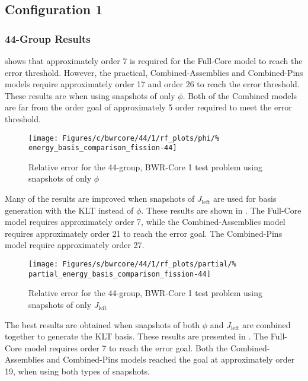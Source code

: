 \subsection{Configuration 1}

\subsubsection{44-Group Results}

 shows that approximately order 7 is required for the 
Full-Core model to reach the error threshold.  However, the practical,  
Combined-Assemblies and Combined-Pins models require approximately order 17 and 
order 26 to reach the error threshold.  These results are when using snapshots 
of 
only $\phi$.  Both of the Combined models are far from the order goal 
of approximately 5 order required to meet the error threshold.

\begin{figure*}[tb]
    \centering
    \texttt{[image: Figures/c/bwrcore/44/1/rf\_plots/phi/\%
        energy\_basis\_comparison\_fission-44]}
    \caption{Relative error for the 44-group, BWR-Core 1 test problem using 
        snapshots of only $\phi$}
    \label{fig:BWR1_phi}
\end{figure*}

Many of the results are improved when snapshots of $J_{\text{left}}$ are used 
for basis generation with the KLT instead of $\phi$. 
 These results are shown in .  The Full-Core 
model requires approximately order 7, while the Combined-Assemblies model 
requires approximately order 21 to reach the error goal.  The Combined-Pins 
model 
require approximately order 27.  

\begin{figure*}[tb]
    \centering
    \texttt{[image: Figures/s/bwrcore/44/1/rf\_plots/partial/\%
        partial\_energy\_basis\_comparison\_fission-44]}
    \caption{Relative error for the 44-group, BWR-Core 1 test problem using 
        snapshots of only $J_{\text{left}}$}
    \label{fig:BWR1_partial}
\end{figure*}

The best results are obtained when snapshots of both $\phi$ and 
$J_{\text{left}}$ are combined together to generate the KLT basis.  
These results are presented in .  The Full-Core 
model requires order 7 to reach the error goal.  Both the Combined-Assemblies 
and Combined-Pins models reached the goal at approximately order 19, when 
using both types of snapshots.

